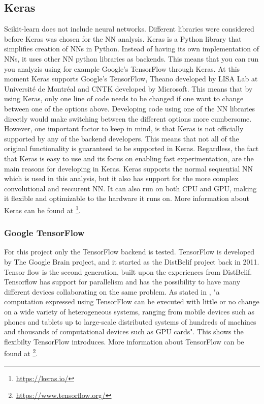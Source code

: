     \subsection{Keras}
        Scikit-learn does not include neural networks. Different libraries were considered before Keras was chosen for the NN analysis. Keras \cite{chollet2015keras} is a Python library that simplifies creation of NNs in Python. Instead of having its own implementation of NNs, it uses other NN python libraries as backends. This means that you can run you analyzis using for example Google's TensorFlow through Keras. At this moment Keras supports Google's TensorFlow, Theano developed by LISA Lab at Université de Montréal and CNTK developed by Microsoft. This means that by using Keras, only one line of code needs to be changed if one want to change between one of the options above. Developing code using one of the NN libraries directly would make switching between the different options more cumbersome. However, one important factor to keep in mind, is that Keras is not officially supported by any of the backend developers. This means that  not all of the original functionality is guaranteed to be supported in Keras. Regardless, the fact that Keras is easy to use and its focus on enabling fast experimentation, are the main reasons for developing in Keras. Keras supports the normal sequential NN which is used in this analysis, but it also has support for the more complex convolutional and reccurent NN. It can also run on both CPU and GPU, making it flexible and optimizable to the hardware it runs on. More information about Keras can be found at \footnote{\url{https://keras.io/}}.
            
        \subsubsection{Google TensorFlow}
            For this project only the TensorFlow backend is tested. TensorFlow \cite{Abadi} is developed by The Google Brain project, and it started as the DistBelif project back in 2011. Tensor flow is the second generation, built upon the experiences from DistBelif. Tensorflow has support for parallelism and has the possibility to have many different devices collaborating on the same problem. As stated in \cite{Abadi}, "a computation expressed using TensorFlow can be executed with little or no change on a wide variety of heterogeneous systems, ranging from mobile devices such as phones and tablets up to large-scale distributed systems of hundreds of machines and thousands of computational devices such as GPU cards". This shows the flexibilty TensorFlow introduces. More information about TensorFlow can be found at \footnote{\url{https://www.tensorflow.org/}}.
        

